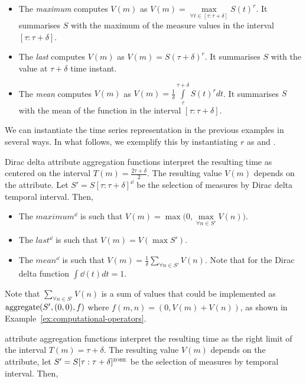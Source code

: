 \begin{itemize}

\item The \emph{maximum} computes $V(m)$ as $V(m) =
  \max\limits_{\forall t \in [\tau:\tau+\delta]} S(t)^r$. It
  summarises $S$ with the maximum of the measure values in the
  interval $[\tau:\tau+\delta]$.

\item The \emph{last} computes $V(m)$ as $V(m) = S(\tau+\delta)^r$. It
  summarises $S$ with the value at $\tau+\delta$ time instant.

\item The \emph{mean} computes $V(m)$ as $V(m) = \frac{1}{\delta}
  \int\limits_{\tau}^{\tau+\delta} S(t)^r dt$. It summarises $S$ with
  the mean of the function in the interval $[\tau:\tau+\delta]$.

\end{itemize}

We can instantiate the time series representation in the previous
examples in several ways. In what follows, we exemplify this by
instantiating $r$ as \dd{} and \zohe{}.

Dirac delta attribute aggregation functions interpret the resulting
time as centered on the interval $T(m)=\frac{2\tau+\delta}{2}$. The
resulting value $V(m)$ depends on the attribute. Let
$S'=S[\tau:\tau+\delta]^\dd$ be the selection of measures by Dirac
delta temporal interval. Then,
\begin{itemize}
\item The $maximum^\dd$ is such that $V(m) =
  \max\big(0,\max\limits_{\forall n \in S'} V(n)\big)$.
\item The $last^\dd$ is such that $V(m) = V(\max S')$.
\item The $mean^\dd$ is such that $V(m) = \frac{1}{\delta}
  \sum\limits_{\forall n \in S'} V(n)$. Note that for the Dirac
  delta function $\int\dd(t)dt=1$.
\end{itemize}

Note that $\sum\limits_{\forall n \in S'} V(n)$ is a sum of values
that could be implemented as $\operatorname*{aggregate}(S',(0,0),f)$ where
$f(m,n)=(0,V(m)+V(n))$, as shown in
Example~\ref{ex:computational-operators}.

\zohe{} attribute aggregation functions interpret the resulting time
as the right limit of the interval $T(m)=\tau+\delta$. The resulting
value $V(m)$ depends on the attribute, let
$S'=S[\tau:\tau+\delta]^\zohe{}$ be the selection of measures by
\zohe{} temporal interval. Then,


